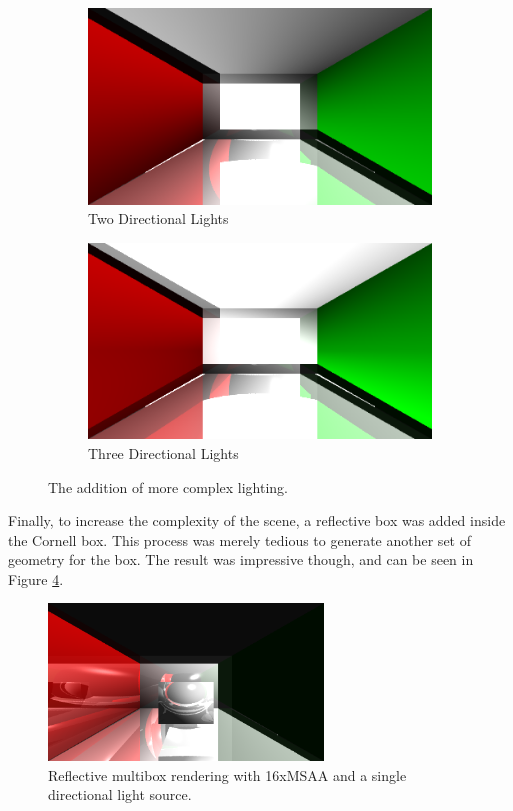 \documentclass[letterpaper, 11pt, onecolumn, oneside]{article}
\begin{document}
    \begin{figure}
    \centering
    \begin{subfigure}{.5\textwidth}
      \centering
      \includegraphics[width=.85\linewidth]{box-16xAA-2xML-phong-shadows-reflections.png}
      \caption{Two Directional Lights}
      \label{fig:twolights}
    \end{subfigure}%
    \begin{subfigure}{.5\textwidth}
      \centering
      \includegraphics[width=.85\linewidth]{box-16xAA-3xML-phong-shadows-reflections.png}
      \caption{Three Directional Lights}
      \label{fig:threelights}
    \end{subfigure}
    \label{fig:multilights}
    \caption{The addition of more complex lighting.}
    \end{figure}

    Finally, to increase the complexity of the scene, a reflective box was added inside the Cornell box.
    This process was merely tedious to generate another set of geometry for the box.
    The result was impressive though, and can be seen in Figure \ref{fig:multibox}.

    \begin{figure}[ht]
        \includegraphics[width=0.65\textwidth]{box-16xAA-1xML-multibox-full.png}
        \centering
        \caption{Reflective multibox rendering with 16xMSAA and a single directional light source.}
        \label{fig:multibox}
    \end{figure}
\end{document}
